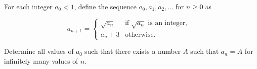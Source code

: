 For each integer $a_0 < 1$, define the sequence $a_0, a_1, a_2, \ldots$ for $n \geq 0$ as

$$a_{n+1} = 
\begin{cases}
\sqrt{a_n} & \text{if } \sqrt{a_n} \text{ is an integer,} \\
a_n + 3    & \text{otherwise.}
\end{cases}
$$

Determine all values of $a_0$ such that there exists a number $A$ such that $a_n = A$ for infinitely many values of $n$.
